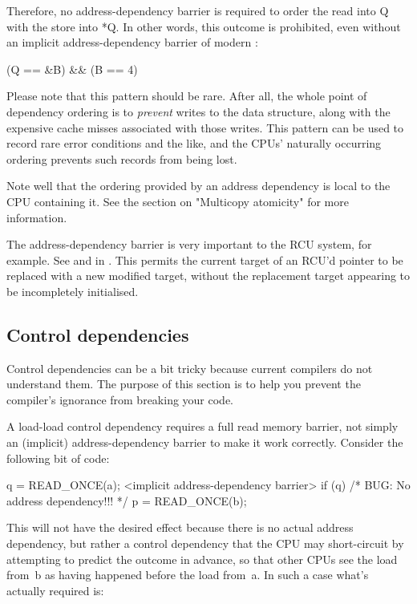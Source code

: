 Therefore, no address-dependency barrier is required to order the read into
Q with the store into *Q.  In other words, this outcome is prohibited,
even without an implicit address-dependency barrier of modern :

\begin{VerbatimU}
	(Q == &B) && (B == 4)
\end{VerbatimU}

Please note that this pattern should be rare.
After all, the whole point of dependency ordering is to \emph{prevent}
writes to the data structure, along with the expensive cache misses
associated with those writes.
This pattern can be used to record rare error conditions and the like,
and the CPUs' naturally occurring ordering prevents such records from
being lost.


Note well that the ordering provided by an address dependency is local to
the CPU containing it.
See the section on "Multicopy atomicity" for more information.


The address-dependency barrier is very important to the RCU system,
for example.
See  and  in
.
This permits the current target of an RCU'd pointer to be replaced with
a new modified target, without the replacement target appearing to be
incompletely initialised.


\subsection{Control dependencies}

Control dependencies can be a bit tricky because current compilers do
not understand them.
The purpose of this section is to help you prevent the compiler's ignorance
from breaking your code.

A load-load control dependency requires a full read memory barrier, not
simply an (implicit) address-dependency barrier to make it work correctly.
Consider the following bit of code:

\begin{VerbatimU}
	q = READ_ONCE(a);
	<implicit address-dependency barrier>
	if (q) {
		/* BUG: No address dependency!!! */
		p = READ_ONCE(b);
	}
\end{VerbatimU}

This will not have the desired effect because there is no actual address
dependency, but rather a control dependency that the CPU may short-circuit
by attempting to predict the outcome in advance, so that other CPUs see
the load from~b as having happened before the load from~a.
In such a case what's actually required is:

